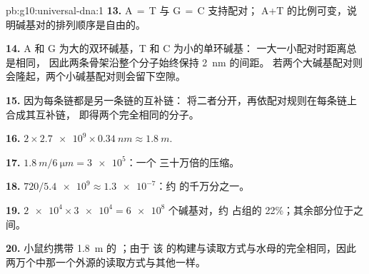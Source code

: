\begin{solution}{pb:g10:universal-dna:1}
\textbf{13.} A$\,=\,$T 与 G$\,=\,$C 支持配对；
A+T 的比例可变，说明碱基对的排列顺序是自由的。

\textbf{14.} A 和 G 为大的双环碱基，T 和 C 为小的单环碱基：
一大一小配对时距离总是相同，
因此两条骨架沿整个分子始终保持 \qty{2}{nm} 的间距。
若两个大碱基配对则会隆起，两个小碱基配对则会留下空隙。

\textbf{15.} 因为每条链都是另一条链的互补链：
将二者分开，再依配对规则在每条链上合成其互补链，
即得两个完全相同的分子。

\textbf{16.} $2 \times \num{2.7e9} \times \qty{0.34}{nm} \approx
\qty{1.8}{m}$.

\textbf{17.} $\qty{1.8}{m} / \qty{6}{\micro m} = \num{3e5}$：一个
三十万倍的压缩。

\textbf{18.} $720 / \num{5.4e9} \approx \num{1.3e-7}$：约
  的千万分之一。

\textbf{19.} $\num{2e4} \times \num{3e4} = \num{6e8}$ 个碱基对，约
占组的 22\%；其余部分位于之间。

\textbf{20.} 小鼠约携带 \qty{1.8}{m} 的 ；由于
该  的构建与读取方式与水母的完全相同，因此
两万个中那一个外源的读取方式与其他一样。
\end{solution}
